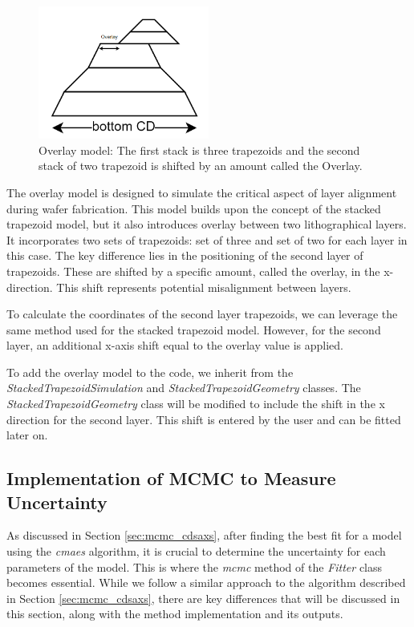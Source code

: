 \medskip

\begin{figure}[h]
    \centering
    \includegraphics[width=0.5\textwidth]{images/overlay.png}
    \caption{Overlay model: The first stack is three trapezoids and the second stack of two trapezoid is shifted by an amount called the Overlay.}
    \label{fig:overlay}
\end{figure}

\FloatBarrier

The overlay model is designed to simulate the critical aspect of layer alignment during wafer 
fabrication. This model builds upon the concept of the stacked trapezoid model, but it also introduces 
overlay between two lithographical layers.
It incorporates two sets of trapezoids: set of three and set of two for each layer in this case. The 
key difference lies in the positioning of the second layer of trapezoids. These are shifted by a 
specific amount, called the overlay, in the x-direction. This shift 
represents potential misalignment between layers.


To calculate the coordinates of the second layer trapezoids, we can leverage the same method 
used for the stacked trapezoid model. However, for the second layer, an additional x-axis shift 
equal to the overlay value is applied.

\medskip

To add the overlay model to the code, we inherit from the \textit{StackedTrapezoidSimulation} and \textit{StackedTrapezoidGeometry} classes.
The \textit{StackedTrapezoidGeometry} class will be modified to include the shift in the x direction for the second layer. This shift is entered by the
user and can be fitted later on.

\subsection{Implementation of MCMC to Measure Uncertainty}
As discussed in Section \ref{sec:mcmc_cdsaxs}, after finding the best fit for a model using the \textit{cmaes} algorithm, it is crucial 
to determine the uncertainty for each parameters of the model. This is where the \textit{mcmc} method of the \textit{Fitter} class becomes essential. 
While we follow a similar approach to the algorithm described in Section \ref{sec:mcmc_cdsaxs}, there are key differences that will be discussed 
in this section, along with the method implementation and its outputs.

